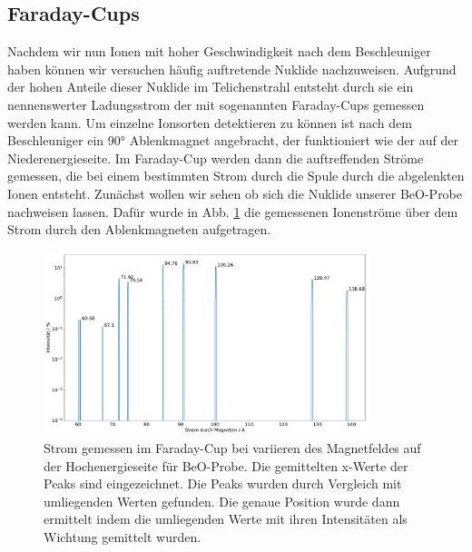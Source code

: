 \subsection{Faraday-Cups}
Nachdem wir nun Ionen mit hoher Geschwindigkeit nach dem Beschleuniger haben können wir versuchen häufig auftretende Nuklide nachzuweisen.
Aufgrund der hohen Anteile dieser Nuklide im Telichenstrahl entsteht durch sie ein nennenswerter Ladungsstrom der mit sogenannten Faraday-Cups gemessen werden kann.
Um einzelne Ionsorten detektieren zu können ist nach dem Beschleuniger ein \ang{90} Ablenkmagnet angebracht, der funktioniert wie der auf der Niederenergieseite.
Im Faraday-Cup werden dann die auftreffenden Ströme gemessen, die bei einem bestimmten Strom durch die Spule durch die abgelenkten Ionen entsteht.
Zunächst wollen wir sehen ob sich die Nuklide unserer BeO-Probe nachweisen lassen.
Dafür wurde in Abb. \ref{Auswertung_Bild_Faraday_Cup_BeO_HE} die gemessenen Ionenströme über dem Strom durch den Ablenkmagneten aufgetragen.
\begin{figure}[ht]
	\centering
           \includegraphics[width=0.85\textwidth]{Pictures/HEMass60-140pos153BeOTUDPract.pdf}
	\caption{Strom gemessen im Faraday-Cup bei variieren des Magnetfeldes auf der Hochenergieseite für BeO-Probe. Die gemittelten x-Werte der Peaks sind eingezeichnet. Die Peaks wurden durch Vergleich mit umliegenden Werten gefunden. Die genaue Position wurde dann ermittelt indem die umliegenden Werte mit ihren Intensitäten als Wichtung gemittelt wurden.}
	\label{Auswertung_Bild_Faraday_Cup_BeO_HE}
\end{figure}

